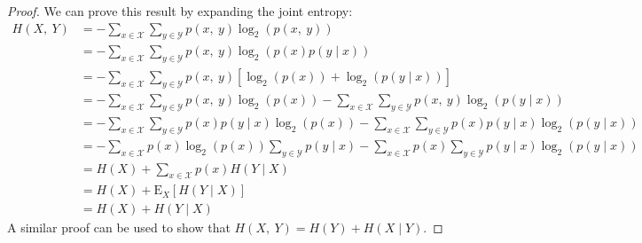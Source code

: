 \documentclass{article}
\begin{document}
\begin{proof}
    We can prove this result by expanding the joint entropy:
    \begin{align*}
        H\left( X,\: Y \right) & = -\sum_{x \in \mathcal{X}} \sum_{y \in \mathcal{Y}} p\left( x,\: y \right) \log_2{\left( p\left( x,\: y \right) \right)}                                                                                                                                                               \\
                               & = -\sum_{x \in \mathcal{X}} \sum_{y \in \mathcal{Y}} p\left( x,\: y \right) \log_2{\left( p\left( x \right) p\left( y \mid x \right) \right)}                                                                                                                                           \\
                               & = -\sum_{x \in \mathcal{X}} \sum_{y \in \mathcal{Y}} p\left( x,\: y \right) \left[ \log_2{\left( p\left( x \right) \right)} + \log_2{\left( p\left( y \mid x \right) \right)} \right]                                                                                                   \\
                               & = -\sum_{x \in \mathcal{X}} \sum_{y \in \mathcal{Y}} p\left( x,\: y \right) \log_2{\left( p\left( x \right) \right)} - \sum_{x \in \mathcal{X}} \sum_{y \in \mathcal{Y}} p\left( x,\: y \right) \log_2{\left( p\left( y \mid x \right) \right)}                                         \\
                               & = -\sum_{x \in \mathcal{X}} \sum_{y \in \mathcal{Y}} p\left( x \right) p\left( y \mid x \right) \log_2{\left( p\left( x \right) \right)} - \sum_{x \in \mathcal{X}} \sum_{y \in \mathcal{Y}} p\left( x \right) p\left( y \mid x \right) \log_2{\left( p\left( y \mid x \right) \right)} \\
                               & = -\sum_{x \in \mathcal{X}} p\left( x \right) \log_2{\left( p\left( x \right) \right)} \sum_{y \in \mathcal{Y}} p\left( y \mid x \right) - \sum_{x \in \mathcal{X}} p\left( x \right) \sum_{y \in \mathcal{Y}} p\left( y \mid x \right) \log_2{\left( p\left( y \mid x \right) \right)} \\
                               & = H\left( X \right) + \sum_{x \in \mathcal{X}} p\left( x \right) H\left( Y \mid X \right)                                                                                                                                                                                               \\
                               & = H\left( X \right) + \mathrm{E}_X\left[ H\left( Y \mid X \right) \right]                                                                                                                                                                                                               \\
                               & = H\left( X \right) + H\left( Y \mid X \right)
    \end{align*}
    A similar proof can be used to show that \(H\left( X,\: Y \right) = H\left( Y \right) + H\left( X \mid Y \right)\).
\end{proof}
\end{document}

